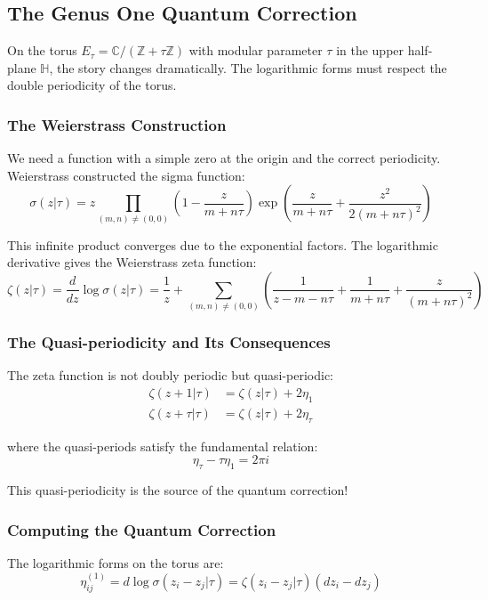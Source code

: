 \subsection{The Genus One Quantum Correction}

On the torus $E_\tau = \mathbb{C}/(\mathbb{Z} + \tau\mathbb{Z})$ with modular parameter $\tau$ in the upper half-plane $\mathbb{H}$, the story changes dramatically. The logarithmic forms must respect the double periodicity of the torus.

\subsubsection{The Weierstrass Construction}

We need a function with a simple zero at the origin and the correct periodicity. Weierstrass constructed the sigma function:
$$\sigma(z|\tau) = z \prod_{(m,n) \neq (0,0)} \left(1 - \frac{z}{m + n\tau}\right) \exp\left(\frac{z}{m+n\tau} + \frac{z^2}{2(m+n\tau)^2}\right)$$

This infinite product converges due to the exponential factors. The logarithmic derivative gives the Weierstrass zeta function:
$$\zeta(z|\tau) = \frac{d}{dz}\log\sigma(z|\tau) = \frac{1}{z} + \sum_{(m,n) \neq (0,0)} \left(\frac{1}{z - m - n\tau} + \frac{1}{m + n\tau} + \frac{z}{(m + n\tau)^2}\right)$$

\subsubsection{The Quasi-periodicity and Its Consequences}

The zeta function is not doubly periodic but quasi-periodic:
\begin{align}
\zeta(z + 1|\tau) &= \zeta(z|\tau) + 2\eta_1 \\
\zeta(z + \tau|\tau) &= \zeta(z|\tau) + 2\eta_\tau
\end{align}

where the quasi-periods satisfy the fundamental relation:
$$\eta_\tau - \tau\eta_1 = 2\pi i$$

This quasi-periodicity is the source of the quantum correction!

\subsubsection{Computing the Quantum Correction}

The logarithmic forms on the torus are:
$$\eta_{ij}^{(1)} = d\log\sigma(z_i - z_j|\tau) = \zeta(z_i - z_j|\tau)(dz_i - dz_j)$$

